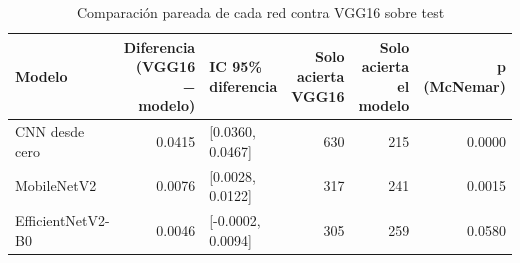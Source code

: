 \begin{table}
\caption{Comparación pareada de cada red contra VGG16 sobre test}
\label{tab:bono_pareada}
\begin{tabular}{lrlrrr}
\toprule
Modelo & Diferencia (VGG16 − modelo) & IC 95\% diferencia & Solo acierta VGG16 & Solo acierta el modelo & p (McNemar) \\
\midrule
CNN desde cero & 0.0415 & [0.0360, 0.0467] & 630 & 215 & 0.0000 \\
MobileNetV2 & 0.0076 & [0.0028, 0.0122] & 317 & 241 & 0.0015 \\
EfficientNetV2-B0 & 0.0046 & [-0.0002, 0.0094] & 305 & 259 & 0.0580 \\
\bottomrule
\end{tabular}
\end{table}
